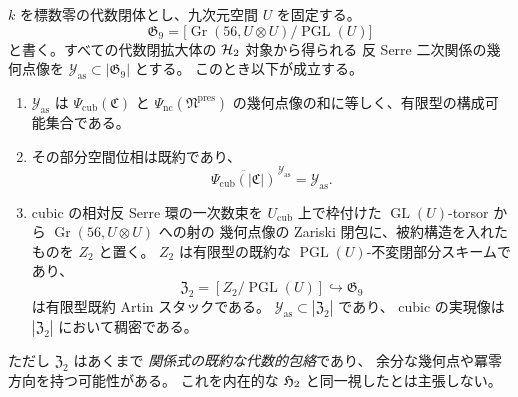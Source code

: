 \begin{proposition}
\label{prop:h2-constructible-relations-and-irreducible-closure}
$k$ を標数零の代数閉体とし、九次元空間 $U$ を固定する。
\[
 \mathfrak G_9=
 \bigl[\operatorname{Gr}(56,U\otimes U)/\operatorname{PGL}(U)\bigr]
\]
と書く。すべての代数閉拡大体の $\mathcal H_2$ 対象から得られる
反 Serre 二次関係の幾何点像を
$\mathcal Y_{\mathrm{as}}\subset|\mathfrak G_9|$ とする。
このとき以下が成立する。
\begin{enumerate}
\item $\mathcal Y_{\mathrm{as}}$ は
  $\Psi_{\mathrm{cub}}(\mathfrak C)$ と
  $\Psi_{\mathrm{nc}}(\mathfrak N^{\mathrm{pres}})$
  の幾何点像の和に等しく、有限型の構成可能集合である。
\item その部分空間位相は既約であり、
  \[
   \overline{\Psi_{\mathrm{cub}}(|\mathfrak C|)}
           ^{\,\mathcal Y_{\mathrm{as}}}
     =\mathcal Y_{\mathrm{as}} .
  \]
\item cubic の相対反 Serre 環の一次数束を
  $U_{\mathrm{cub}}$ 上で枠付けた
  $\operatorname{GL}(U)$-torsor から
  $\operatorname{Gr}(56,U\otimes U)$ への射の
  幾何点像の Zariski 閉包に、被約構造を入れたものを
  $Z_2$ と置く。
  $Z_2$ は有限型の既約な
  $\operatorname{PGL}(U)$-不変閉部分スキームであり、
  \[
    \mathfrak Z_2=[Z_2/\operatorname{PGL}(U)]
       \hookrightarrow\mathfrak G_9
       \tag{H2-envelope}\label{eq:h2-irreducible-envelope}
  \]
  は有限型既約 Artin スタックである。
  $\mathcal Y_{\mathrm{as}}\subset|\mathfrak Z_2|$ であり、
  cubic の実現像は $|\mathfrak Z_2|$ において稠密である。
\end{enumerate}
ただし $\mathfrak Z_2$ はあくまで
\emph{関係式の既約な代数的包絡}であり、
余分な幾何点や冪零方向を持つ可能性がある。
これを内在的な $\mathfrak H_2$ と同一視したとは主張しない。
\end{proposition}
